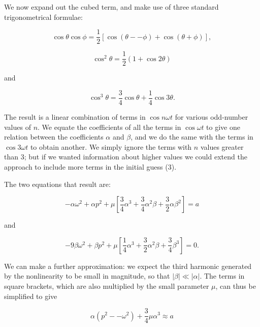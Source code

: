   We now expand out the cubed term, and make use of three standard 
  trigonometrical formulae: 

  \begin{equation*}\cos \theta \cos \phi = \frac{1}{2} \left[\cos (\theta -- 
  \phi) + \cos (\theta + \phi) \right], \tag{5}\end{equation*} 

  \begin{equation*}\cos^2 \theta = \dfrac{1}{2}\left(1 + \cos 2 \theta \right) 
  \tag{6}\end{equation*} 

  \noindent{}and 

  \begin{equation*}\cos^3 \theta =\frac{3}{4}\cos \theta + \frac{1}{4} \cos 3 
  \theta . \tag{7}\end{equation*} 

  The result is a linear combination of terms in $\cos n\omega t$ for various 
  odd-number values of $n$. We equate the coefficients of all the terms in 
  $\cos \omega t$ to give one relation between the coefficients $\alpha$ and 
  $\beta$, and we do the same with the terms in $\cos 3 \omega t$ to obtain 
  another. We simply ignore the terms with $n$ values greater than 3; but if we 
  wanted information about higher values we could extend the approach to 
  include more terms in the initial guess (3). 

  The two equations that result are: 

  \begin{equation*}-\alpha \omega^2 + \alpha p^2 + \mu 
  \left[\frac{3}{4}\alpha^3 + \frac{3}{4}\alpha^2 \beta +\frac{3}{2}\alpha 
  \beta^2 \right] = a \tag{8}\end{equation*} 

  \noindent{}and 

  \begin{equation*}-9\beta \omega^2+ \beta p^2 + \mu \left[\frac{1}{4}\alpha^3 
  + \frac{3}{2}\alpha^2 \beta +\frac{3}{4} \beta^3 \right] = 0 . 
  \tag{9}\end{equation*} 

  We can make a further approximation: we expect the third harmonic generated 
  by the nonlinearity to be small in magnitude, so that $ |\beta | \ll |\alpha 
  |$. The terms in square brackets, which are also multiplied by the small 
  parameter $\mu$, can thus be simplified to give 

  \begin{equation*}\alpha (p^2 -- \omega^2) +\dfrac{3}{4} \mu \alpha^3 \approx 
  a \tag{10}\end{equation*} 

